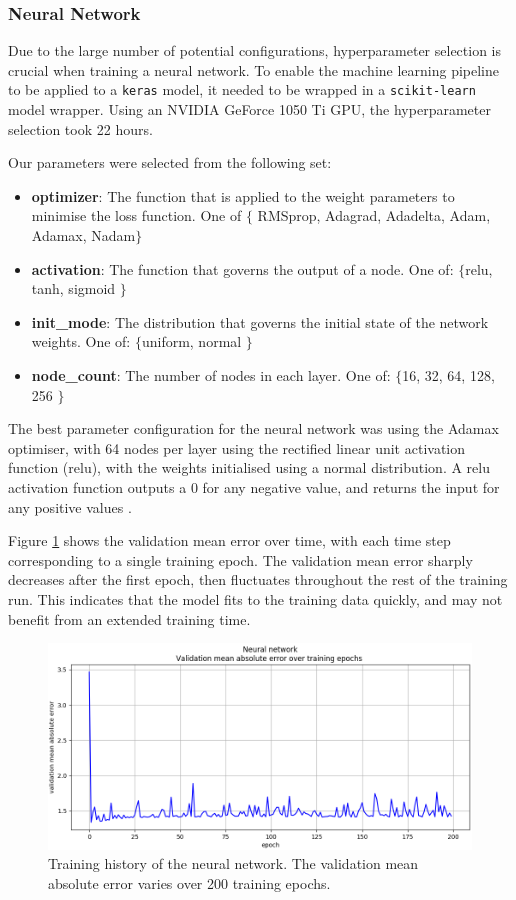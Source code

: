 \documentclass[11pt,conference]{IEEEtran}
\begin{document}
\subsubsection{Neural Network}
Due to the large number of potential configurations, hyperparameter selection is crucial when training a neural network. To enable the machine learning pipeline to be applied to a \texttt{keras} model, it needed to be wrapped in a \texttt{scikit-learn} model wrapper. Using an NVIDIA GeForce 1050 Ti GPU, the hyperparameter selection took 22 hours.

Our parameters were selected from the following set:
\begin{itemize}
    \item \textbf{optimizer}: The function that is applied to the weight parameters to minimise the loss function. One of $\{$ RMSprop, Adagrad, Adadelta, Adam, Adamax, Nadam$\}$
    \item \textbf{activation}: The function that governs the output of a node. One of: $\{$relu, tanh, sigmoid $\}$
    \item \textbf{init\_mode}: The distribution that governs the initial state of the network weights. One of: $\{$uniform, normal $\}$
    \item \textbf{node\_count}: The number of nodes in each layer. One of: $\{$16, 32, 64, 128, 256 $\}$
\end{itemize}

The best parameter configuration for the neural network was using the Adamax optimiser, with 64 nodes per layer using the rectified linear unit activation function (relu), with the weights initialised using a normal distribution. A relu activation function outputs a 0 for any negative value, and returns the input for any positive values \cite{goodfellow2016deep}. 

Figure \ref{fig:nntraining} shows the validation mean error over time, with each time step corresponding to a single training epoch. The validation mean error sharply decreases after the first epoch, then fluctuates throughout the rest of the training run. This indicates that the model fits to the training data quickly, and may not benefit from an extended training time.
\begin{figure}[htbp]
	\begin{center}
    	\includegraphics[width=\linewidth]{figures/neural_network_training.png}
	\caption{Training history of the neural network. The validation mean absolute error varies over 200 training epochs. }
	\label{fig:nntraining}
	\end{center}
\end{figure}
\end{document}
